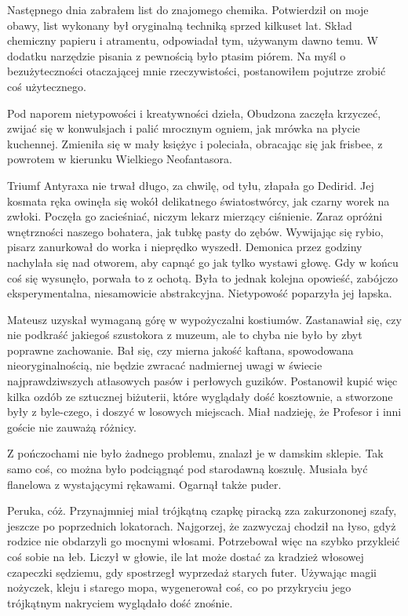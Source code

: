 Następnego dnia zabrałem list do znajomego chemika.
Potwierdził on moje obawy, list wykonany był oryginalną techniką sprzed kilkuset lat.
Skład chemiczny papieru i atramentu, odpowiadał tym, używanym dawno temu.
W dodatku narzędzie pisania z pewnością było ptasim piórem.
Na myśl o bezużyteczności otaczającej mnie rzeczywistości, postanowiłem pojutrze zrobić coś użytecznego.

\divider{}

Pod naporem nietypowości i kreatywności dzieła, Obudzona zaczęła krzyczeć, zwijać się w konwulsjach i palić mrocznym ogniem, jak mrówka na płycie kuchennej.
Zmieniła się w mały księżyc i poleciała, obracając się jak frisbee, z powrotem w kierunku Wielkiego Neofantasora.

Triumf Antyraxa nie trwał długo, za chwilę, od tyłu, złapała go Dedirid.
Jej kosmata ręka owinęła się wokół delikatnego światostwórcy, jak czarny worek na zwłoki.
Poczęła go zacieśniać, niczym lekarz mierzący ciśnienie.
Zaraz opróżni wnętrzności naszego bohatera, jak tubkę pasty do zębów.
Wywijając się rybio, pisarz zanurkował do worka i nieprędko wyszedł.
Demonica przez godziny nachylała się nad otworem, aby capnąć go jak tylko wystawi głowę.
Gdy w końcu coś się wysunęło, porwała to z ochotą.
Była to jednak kolejna opowieść, zabójczo eksperymentalna, niesamowicie abstrakcyjna.
Nietypowość poparzyła jej łapska.

\divider{}

Mateusz uzyskał wymaganą górę w wypożyczalni kostiumów.
Zastanawiał się, czy nie podkraść jakiegoś szustokora z muzeum, ale to chyba nie było by zbyt poprawne zachowanie.
Bał się, czy mierna jakość kaftana, spowodowana nieoryginalnością, nie będzie zwracać nadmiernej uwagi w świecie najprawdziwszych atłasowych pasów i perłowych guzików.
Postanowił kupić więc kilka ozdób ze sztucznej biżuterii, które wyglądały dość kosztownie, a stworzone były z byle-czego, i doszyć w losowych miejscach. 
Miał nadzieję, że Profesor i inni goście nie zauważą różnicy.

Z pończochami nie było żadnego problemu, znalazł je w damskim sklepie.
Tak samo coś, co można było podciągnąć pod starodawną koszulę.
Musiała być flanelowa z wystającymi rękawami.
Ogarnął także puder.

Peruka, cóż. Przynajmniej miał trójkątną czapkę piracką zza zakurzononej szafy, jeszcze po poprzednich lokatorach.
Najgorzej, że zazwyczaj chodził na łyso, gdyż rodzice nie obdarzyli go mocnymi włosami.
Potrzebował więc na szybko przykleić coś sobie na łeb.
Liczył w głowie, ile lat może dostać za kradzież włosowej czapeczki sędziemu, gdy spostrzegł wyprzedaż starych futer.
Używając magii nożyczek, kleju i starego mopa, wygenerował coś, co po przykryciu jego trójkątnym nakryciem wyglądało dość znośnie.

